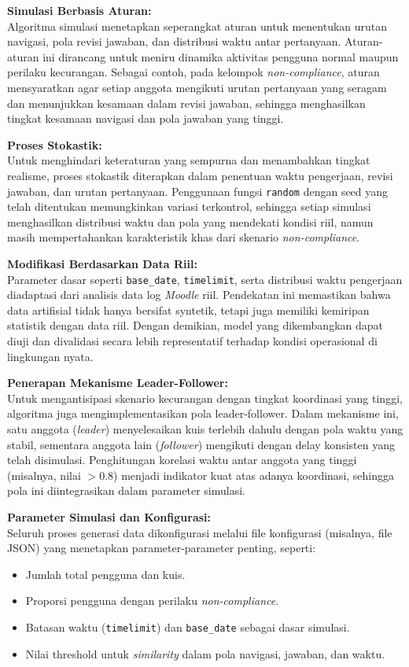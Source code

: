 \textbf{Simulasi Berbasis Aturan:} \\
Algoritma simulasi menetapkan seperangkat aturan untuk menentukan urutan navigasi, pola revisi jawaban, dan distribusi waktu antar pertanyaan. Aturan-aturan ini dirancang untuk meniru dinamika aktivitas pengguna normal maupun perilaku kecurangan. Sebagai contoh, pada kelompok \textit{non-compliance}, aturan mensyaratkan agar setiap anggota mengikuti urutan pertanyaan yang seragam dan menunjukkan kesamaan dalam revisi jawaban, sehingga menghasilkan tingkat kesamaan navigasi dan pola jawaban yang tinggi.

\textbf{Proses Stokastik:} \\
Untuk menghindari keteraturan yang sempurna dan menambahkan tingkat realisme, proses stokastik diterapkan dalam penentuan waktu pengerjaan, revisi jawaban, dan urutan pertanyaan. Penggunaan fungsi \texttt{random} dengan seed yang telah ditentukan memungkinkan variasi terkontrol, sehingga setiap simulasi menghasilkan distribusi waktu dan pola yang mendekati kondisi riil, namun masih mempertahankan karakteristik khas dari skenario \textit{non-compliance}.

\textbf{Modifikasi Berdasarkan Data Riil:} \\
Parameter dasar seperti \texttt{base\_date}, \texttt{timelimit}, serta distribusi waktu pengerjaan diadaptasi dari analisis data log \textit{Moodle} riil. Pendekatan ini memastikan bahwa data artifisial tidak hanya bersifat syntetik, tetapi juga memiliki kemiripan statistik dengan data riil. Dengan demikian, model yang dikembangkan dapat diuji dan divalidasi secara lebih representatif terhadap kondisi operasional di lingkungan nyata.

\textbf{Penerapan Mekanisme Leader-Follower:} \\
Untuk mengantisipasi skenario kecurangan dengan tingkat koordinasi yang tinggi, algoritma juga mengimplementasikan pola leader-follower. Dalam mekanisme ini, satu anggota (\textit{leader}) menyelesaikan kuis terlebih dahulu dengan pola waktu yang stabil, sementara anggota lain (\textit{follower}) mengikuti dengan delay konsisten yang telah disimulasi. Penghitungan korelasi waktu antar anggota yang tinggi (misalnya, nilai $>0.8$) menjadi indikator kuat atas adanya koordinasi, sehingga pola ini diintegrasikan dalam parameter simulasi.

\textbf{Parameter Simulasi dan Konfigurasi:} \\
Seluruh proses generasi data dikonfigurasi melalui file konfigurasi (misalnya, file JSON) yang menetapkan parameter-parameter penting, seperti:
\begin{itemize}
    \item Jumlah total pengguna dan kuis.
    \item Proporsi pengguna dengan perilaku \textit{non-compliance}.
    \item Batasan waktu (\texttt{timelimit}) dan \texttt{base\_date} sebagai dasar simulasi.
    \item Nilai threshold untuk \textit{similarity} dalam pola navigasi, jawaban, dan waktu.
\end{itemize}

